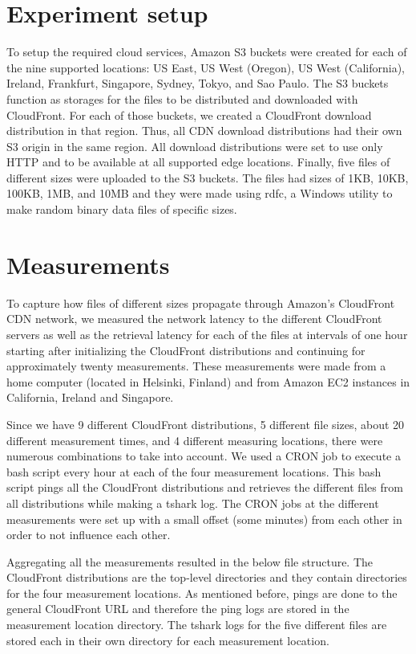 \documentclass[conference]{IEEEtran}
\begin{document}
\section{Experiment setup}
To setup the required cloud services, Amazon S3 buckets were created for each of the nine supported locations: US East, US West (Oregon), US West (California), Ireland, Frankfurt, Singapore, Sydney, Tokyo, and Sao Paulo. The S3 buckets function as storages for the files to be distributed and downloaded with CloudFront. For each of those buckets, we created a CloudFront download distribution in that region. Thus, all CDN download distributions had their own S3 origin in the same region. All download distributions were set to use only HTTP and to be available at all supported edge locations. Finally, five files of different sizes were uploaded to the S3 buckets. The files had sizes of 1KB, 10KB, 100KB, 1MB, and 10MB and they were made using rdfc, a Windows utility to make random binary data files of specific sizes.


\section{Measurements}
To capture how files of different sizes propagate through Amazon's CloudFront CDN network, we measured the network latency to the different CloudFront servers as well as the retrieval latency for each of the files at intervals of one hour starting after initializing the CloudFront distributions and continuing for approximately twenty measurements. These measurements were made from a home computer (located in Helsinki, Finland) and from Amazon EC2 instances in California, Ireland and Singapore.

Since we have 9 different CloudFront distributions, 5 different file sizes, about 20 different measurement times, and 4 different measuring locations, there were numerous combinations to take into account. We used a CRON job to execute a bash script every hour at each of the four measurement locations. This bash script pings all the CloudFront distributions and retrieves the different files from all distributions while making a tshark log. The CRON jobs at the different measurements were set up with a small offset (some minutes) from each other in order to not influence each other.

Aggregating all the measurements resulted in the below file structure. The CloudFront distributions are the top-level directories and they contain directories for the four measurement locations. As mentioned before, pings are done to the general CloudFront URL and therefore the ping logs are stored in the measurement location directory. The tshark logs for the five different files are stored each in their own directory for each measurement location. \\
\end{document}
